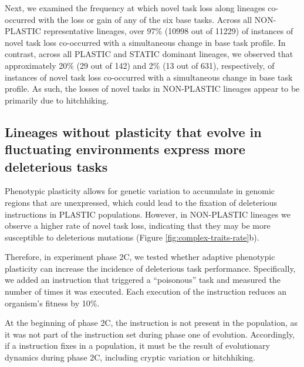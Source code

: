 Next, we examined the frequency at which novel task loss along lineages co-occurred with the loss or gain of any of the six base tasks.
Across all NON-PLASTIC representative lineages, over 97\% (10998 out of 11229) of instances of novel task loss co-occurred with a simultaneous change in base task profile.
In contrast, across all PLASTIC and STATIC dominant lineages, we observed that approximately 20\% (29 out of 142) and 2\% (13 out of 631), respectively, of instances of novel task loss co-occurred with a simultaneous change in base task profile.
As such, the losses of novel tasks in NON-PLASTIC lineages appear to be primarily due to hitchhiking.

\subsection{Lineages without plasticity that evolve in fluctuating environments express more deleterious tasks}


Phenotypic plasticity allows for genetic variation to accumulate in genomic regions that are unexpressed, which could lead to the fixation of deleterious instructions in PLASTIC populations.
However, in NON-PLASTIC lineages we observe a higher rate of novel task loss, indicating that they may be more susceptible to deleterious mutations (Figure \ref{fig:complex-traits-rate}b).

Therefore, in experiment phase 2C, we tested whether adaptive phenotypic plasticity can increase the incidence of deleterious task performance. 
Specifically, we added an instruction that triggered a ``poisonous'' task and measured the number of times it was executed.
Each execution of the   instruction reduces an organism's fitness by 10\%. 

At the beginning of phase 2C, the  instruction is not present in the population, as it was not part of the instruction set during phase one of evolution.
Accordingly, if a  instruction fixes in a population, it must be the result of evolutionary dynamics during phase 2C, including cryptic variation or hitchhiking. 

